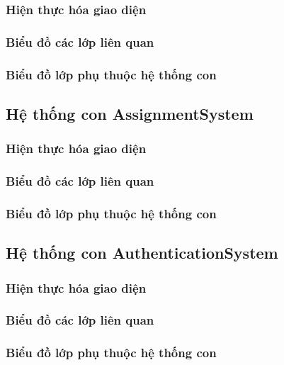 \documentclass[./../main.tex]{subfiles}
\begin{document}
\subsubsection{Hiện thực hóa giao diện}
\subsubsection{Biểu đồ các lớp liên quan}
\subsubsection{Biểu đồ lớp phụ thuộc hệ thống con}

\subsection{Hệ thống con AssignmentSystem}
\subsubsection{Hiện thực hóa giao diện}
\subsubsection{Biểu đồ các lớp liên quan}
\subsubsection{Biểu đồ lớp phụ thuộc hệ thống con}

\subsection{Hệ thống con AuthenticationSystem}
\subsubsection{Hiện thực hóa giao diện}
\subsubsection{Biểu đồ các lớp liên quan}
\subsubsection{Biểu đồ lớp phụ thuộc hệ thống con}
\end{document}
